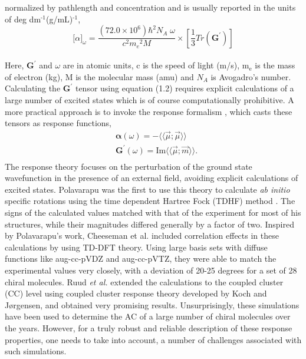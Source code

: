 normalized by pathlength and concentration and is usually reported in the units of deg dm$^{\text{-1}}$(g/mL)$^{\text{-1}}$,\cite{Crawford06}
\\
\begin{equation}
{\lbrack\alpha\rbrack}_{\omega} = \frac{(72.0 \times 10^6){\hbar}^2 N_A\;\omega}{c^2{m_e}^2 M} \times \left[ \frac{1}{3}Tr(\textbf{G}^\prime)\right]
\end{equation}
\\
Here, $\textbf{G}^\prime$ and $\omega$ are in atomic units, c is the speed of light (m/s), m$_{\text{e}}$ is the 
mass of electron (kg), M is the molecular mass (amu) and $N_A$ is Avogadro's number. Calculating the 
$\textbf{G}^\prime$ tensor using equation (1.2) requires explicit calculations of a large number of 
excited states which is of course computationally prohibitive. A more practical approach is to invoke the response formalism
\cite{Kobayashi94,Koch90}, which casts these tensors as response functions,
\begin{equation}
\begin{split}
&\bm{\alpha}(\omega) = -\langle\langle\vec{\mu};\vec{\mu}\rangle\rangle\\
&\textbf{G}^{\prime}(\omega) = \text{Im}\langle\langle\vec{\mu};\vec{m}\rangle\rangle.\\
\end{split}
\end{equation} 
The response theory focuses on the perturbation of the ground state wavefunction in the presence of an external 
field, avoiding explicit calculations of excited states. Polavarapu was the first to use this theory to calculate 
{\em ab initio} specific rotations using the time dependent Hartree Fock (TDHF) method \cite{Polavarapu96}. 
The signs of the calculated values matched with that of the experiment for most of his structures, while their magnitudes 
differed generally by a factor of two. Inspired by Polavarapu's work, Cheeseman et al. \cite{Cheeseman00,Stephens01} 
included correlation effects in these calculations by using TD-DFT theory. Using large basis sets with diffuse functions like 
aug-cc-pVDZ and aug-cc-pVTZ,\cite{Dunning89,Kendall92,Woon94} they were able to match the experimental values very closely, with a 
deviation of 20-25 degrees for a set of 28 chiral molecules. Ruud {\em et al.} extended the calculations to the coupled cluster (CC)
level using coupled cluster response theory developed by Koch and J{\o}rgensen\cite{Koch90}, and obtained very 
promising results\cite{Ruud03}. Unsurprisingly, these simulations have been used to determine the AC of a large number of 
chiral molecules over the years\cite{Kondru99}. However, for a truly robust and reliable description of these response 
properties, one needs to take into account, a number of challenges associated with such simulations.
